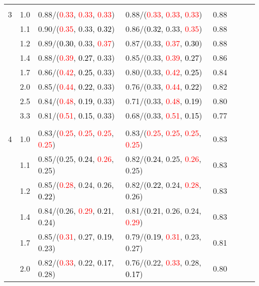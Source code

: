 \documentclass[10pt,a4paper]{report}
\begin{document}
\begin{table}[!htbp]
\begin{center}
{\begin{tabular}{ccllcccc}
			&&&&\\
			3			&1.0&0.88/(\textcolor{red}{0.33}, \textcolor{red}{0.33}, \textcolor{red}{0.33})&0.88/(\textcolor{red}{0.33}, \textcolor{red}{0.33}, \textcolor{red}{0.33})&0.88\\
			&1.1&0.90/(\textcolor{red}{0.35}, 0.33, \textcolor{black}{0.32})&0.86/(\textcolor{black}{0.32}, 0.33, \textcolor{red}{0.35})&0.88\\
			&1.2&0.89/(\textcolor{black}{0.30}, 0.33, \textcolor{red}{0.37})&0.87/(0.33, \textcolor{red}{0.37}, \textcolor{black}{0.30})&0.88\\
			&1.4&0.88/(\textcolor{red}{0.39}, \textcolor{black}{0.27}, 0.33)&0.85/(0.33, \textcolor{red}{0.39}, \textcolor{black}{0.27})&0.86\\
			&1.7&0.86/(\textcolor{red}{0.42}, \textcolor{black}{0.25}, 0.33)&0.80/(0.33, \textcolor{red}{0.42}, \textcolor{black}{0.25})&0.84\\
			&2.0&0.85/(\textcolor{red}{0.44}, \textcolor{black}{0.22}, 0.33)&0.76/(0.33, \textcolor{red}{0.44}, \textcolor{black}{0.22})&0.82\\
			&2.5&0.84/(\textcolor{red}{0.48}, \textcolor{black}{0.19}, 0.33)&0.71/(0.33, \textcolor{red}{0.48}, \textcolor{black}{0.19})&0.80\\
			&3.3&0.81/(\textcolor{red}{0.51}, \textcolor{black}{0.15}, 0.33)&0.68/(0.33, \textcolor{red}{0.51}, \textcolor{black}{0.15})&0.77\\
			&&&&\\
			4			&1.0&0.83/(\textcolor{red}{0.25}, \textcolor{red}{0.25}, \textcolor{red}{0.25}, \textcolor{red}{0.25})&0.83/(\textcolor{red}{0.25}, \textcolor{red}{0.25}, \textcolor{red}{0.25}, \textcolor{red}{0.25})&0.83\\
			&1.1&0.85/(0.25, \textcolor{black}{0.24}, \textcolor{red}{0.26}, 0.25)&0.82/(\textcolor{black}{0.24}, 0.25, \textcolor{red}{0.26}, 0.25)&0.83\\
			&1.2&0.85/(\textcolor{red}{0.28}, 0.24, 0.26, \textcolor{black}{0.22})&0.82/(\textcolor{black}{0.22}, 0.24, \textcolor{red}{0.28}, 0.26)&0.83\\
			&1.4&0.84/(0.26, \textcolor{red}{0.29}, \textcolor{black}{0.21}, 0.24)&0.81/(\textcolor{black}{0.21}, 0.26, 0.24, \textcolor{red}{0.29})&0.83\\
			&1.7&0.85/(\textcolor{red}{0.31}, 0.27, \textcolor{black}{0.19}, 0.23)&0.79/(\textcolor{black}{0.19}, \textcolor{red}{0.31}, 0.23, 0.27)&0.81\\
			&2.0&0.82/(\textcolor{red}{0.33}, 0.22, \textcolor{black}{0.17}, 0.28)&0.76/(0.22, \textcolor{red}{0.33}, 0.28, \textcolor{black}{0.17})&0.80\\

\end{tabular}}
\end{center}
\end{table}
\end{document}
